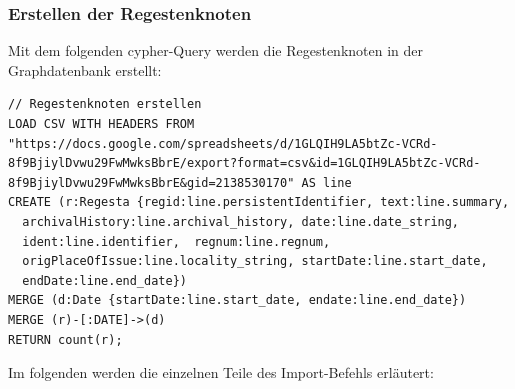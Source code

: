 \documentclass[12pt,ngerman,]{article}
\begin{document}
\subsubsection{Erstellen der
Regestenknoten}\label{erstellen-der-regestenknoten}

Mit dem folgenden cypher-Query werden die Regestenknoten in der
Graphdatenbank erstellt:

\begin{verbatim}
// Regestenknoten erstellen
LOAD CSV WITH HEADERS FROM "https://docs.google.com/spreadsheets/d/1GLQIH9LA5btZc-VCRd-8f9BjiylDvwu29FwMwksBbrE/export?format=csv&id=1GLQIH9LA5btZc-VCRd-8f9BjiylDvwu29FwMwksBbrE&gid=2138530170" AS line
CREATE (r:Regesta {regid:line.persistentIdentifier, text:line.summary,
  archivalHistory:line.archival_history, date:line.date_string,  
  ident:line.identifier,  regnum:line.regnum,
  origPlaceOfIssue:line.locality_string, startDate:line.start_date,
  endDate:line.end_date})
MERGE (d:Date {startDate:line.start_date, endate:line.end_date})
MERGE (r)-[:DATE]->(d)
RETURN count(r);
\end{verbatim}

Im folgenden werden die einzelnen Teile des Import-Befehls erläutert:
\end{document}
